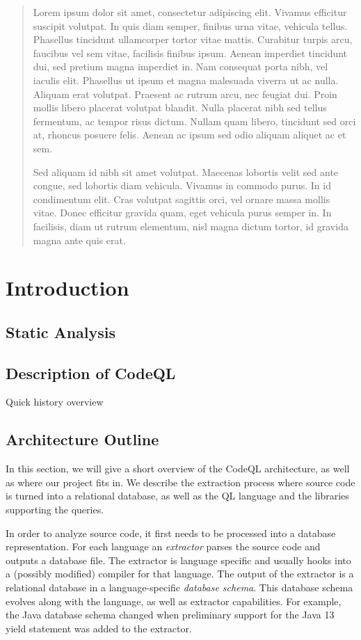 \begin{abstract}
Lorem ipsum dolor sit amet, consectetur adipiscing elit. Vivamus efficitur suscipit volutpat. In quis diam semper, finibus urna vitae, vehicula tellus. Phasellus tincidunt ullamcorper tortor vitae mattis. Curabitur turpis arcu, faucibus vel sem vitae, facilisis finibus ipsum. Aenean imperdiet tincidunt dui, sed pretium magna imperdiet in. Nam consequat porta nibh, vel iaculis elit. Phasellus ut ipsum et magna malesuada viverra ut ac nulla. Aliquam erat volutpat. Praesent ac rutrum arcu, nec feugiat dui. Proin mollis libero placerat volutpat blandit. Nulla placerat nibh sed tellus fermentum, ac tempor risus dictum. Nullam quam libero, tincidunt sed orci at, rhoncus posuere felis. Aenean ac ipsum sed odio aliquam aliquet ac et sem.

Sed aliquam id nibh sit amet volutpat. Maecenas lobortis velit sed ante congue, sed lobortis diam vehicula. Vivamus in commodo purus. In id condimentum elit. Cras volutpat sagittis orci, vel ornare massa mollis vitae. Donec efficitur gravida quam, eget vehicula purus semper in. In facilisis, diam ut rutrum elementum, nisl magna dictum tortor, id gravida magna ante quis erat.
\end{abstract}
\tableofcontents

\newpage
\section{Introduction}
\subsection{Static Analysis}
\subsection{Description of CodeQL}
Quick history overview

\subsection{Architecture Outline}
In this section, we will give a short overview of the CodeQL architecture, as well as where our
project fits in. We describe the extraction process where source code is turned into a relational database,
as well as the QL language and the libraries supporting the queries.

In order to analyze source code, it first needs to be processed into a database representation.
For each language an \emph{extractor} parses the source code and outputs a database file.
The extractor is language specific and usually hooks into a (possibly modified) compiler for that language.
The output of the extractor is a relational database in a language-specific \emph{database schema}.
This database schema evolves along with the language, as well as extractor capabilities.
For example, the Java database schema changed when preliminary support for the Java 13 yield statement was
added to the extractor.

